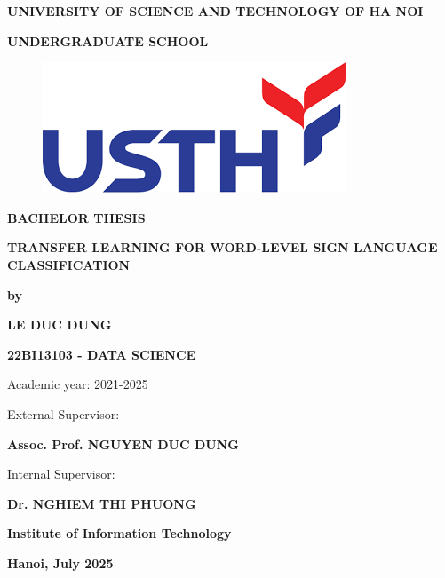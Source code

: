 \documentclass{article}
\begin{document}
\begin{titlepage}
    
    \centering
    \vspace*{1cm}

    {\Large \bfseries UNIVERSITY OF SCIENCE AND TECHNOLOGY OF HA NOI \par}
    {\LARGE \bfseries UNDERGRADUATE SCHOOL \par}

    \begin{figure}[H]
        \centering
        \includegraphics[width=0.50\linewidth]{logo.png}
        \label{fig:logo}
    \end{figure}

    \vspace{0.75cm}
    {\LARGE \bfseries BACHELOR THESIS \par}
    \vspace{1cm}
    {\huge \bfseries TRANSFER LEARNING FOR WORD-LEVEL SIGN LANGUAGE CLASSIFICATION\par}
    \vspace{0.25cm}
    {\Large \bfseries by \par}
    \vspace{0.25cm}
    {\LARGE \bfseries LE DUC DUNG \par}
    {\LARGE \bfseries 22BI13103 - DATA SCIENCE \par}
    {\Large Academic year: 2021-2025 \par}
    \vspace{1.5cm}

    {\Large External Supervisor: \par}
    \vspace{0.15cm}
    {\LARGE \bfseries Assoc. Prof. NGUYEN DUC DUNG \par}
    {\Large Internal Supervisor: \par}
    \vspace{0.15cm}
    {\LARGE \bfseries Dr. NGHIEM THI PHUONG\par}

    \vspace{0.5cm}
    {\LARGE \bfseries Institute of Information Technology \par}

    \vspace{1.5cm}
    {\Large \bfseries Hanoi, July 2025 \par}
\end{titlepage}
\end{document}
